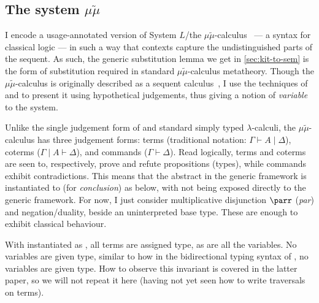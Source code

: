 \subsection{The system $\mu\tilde\mu$}
I encode a usage-annotated version of System $L$/the
$\mu\tilde\mu$-calculus~\citep{CH00} --- a syntax for classical logic --- in
such a way that contexts capture the undistinguished parts of the sequent.
As such, the generic substitution lemma we get in \cref{sec:kit-to-sem} is the
form of substitution required in standard $\mu\tilde\mu$-calculus metatheory.
Though the $\mu\tilde\mu$-calculus is originally described as a sequent
calculus~\citep{CH00}, I use the techniques of
\citet[p.~12]{herbelin-hab} and \citet{LC06} to present it using hypothetical
judgements, thus giving a notion of \emph{variable} to the system.

Unlike the single judgement form of \name{} and standard simply typed
$\lambda$-calculi, the $\mu\tilde\mu$-calculus has three judgement forms:
terms (traditional notation: $\Gamma \vdash A \mid \Delta$), coterms
($\Gamma \mid A \vdash \Delta$), and commands ($\Gamma \vdash \Delta$).
Read logically, terms and coterms are seen to, respectively, prove and refute
propositions (types), while commands exhibit contradictions.
This means that the abstract  in the generic framework is
instantiated to  (for \emph{conclusion}) as below, with
 not being exposed directly to the generic framework.
For now, I just consider multiplicative disjunction $\parr$ (\emph{par}) and
negation/duality, beside an uninterpreted base type.
These are enough to exhibit classical behaviour.

\noindent
\begin{minipage}[t]{0.5\textwidth}
\end{minipage}
\begin{minipage}[t]{0.5\textwidth}
\end{minipage}

With  instantiated as , all terms are assigned
 type, as are all the variables.
No variables are given  type, similar to how in
the bidirectional typing syntax of \citet[p.~25]{AACMM21}, no variables are
given  type.
How to observe this invariant is covered in the latter paper, so we will not
repeat it here (having not yet seen how to write traversals on terms).


